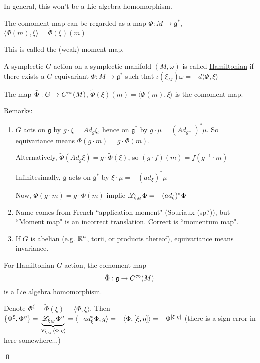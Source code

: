 \documentclass[x11names,reqno,14pt]{extarticle}
\newcommand{\mk}[1]{\mathfrak{#1}}
\newcommand{\g}{\mk{g}}
\newcommand{\pois}[2]{\{#1,#2\}}
\begin{document}
In general, this won't be a Lie algebra homomorphism. 

The comoment map can be regarded as a map $\Phi:M \to \g^*$, $\langle \Phi(m),\xi\rangle = \tilde{\Phi}(\xi)(m)$

This is called the (weak) moment map. 


A symplectic $G$-action on a symplectic manifold $(M,\omega)$ is called \underline{Hamiltonian} if there exists a $G$-equivariant $\Phi:M\to\g^*$ such that $\iota(\xi_M)\omega = -d\langle\Phi,\xi\rangle$

The map $\tilde{\Phi}:G\to C^\infty(M)$, $\tilde{\Phi}(\xi)(m) = \langle \Phi(m),\xi\rangle$ is the comoment map. 

\underline{Remarks:}
\begin{enumerate}
	\item $G$ acts on $\g$ by $g\cdot\xi = Ad_g\xi$, hence on $\g^*$ by $g\cdot\mu = (Ad_{g^{-1}})^*\mu$. So equivariance means $\Phi(g\cdot m) = g\cdot\Phi(m)$.

Alternatively, $\tilde{\Phi}(Ad_g\xi) = g\cdot\tilde{\Phi}(\xi)$, so $(g\cdot f)(m) = f(g^{-1}\cdot m)$

Infinitesimally, $\g$ acts on $\g^*$ by $\xi\cdot\mu = -(ad_\xi)^*\mu$

Now, $\Phi(g\cdot m) = g\cdot \Phi(m)$ implie $\mathscr{L}_{\zeta_M}\Phi = -(ad_\zeta)^*\Phi$

\item Name comes from French ``application moment" (Souriaux (sp?)), but ``Moment map" is an incorrect translation. Correct is ``momentum map". 

\item If $G$ is abelian (e.g. $\mathbb{R}^n$, torii, or products thereof), equivariance means invariance. 
\end{enumerate}

\prop

For Hamiltonian $G$-action, the comoment map 
\[
\tilde{\Phi}:\g\to C^\oo(M)
\]
is a Lie algebra homomorphism. 

\proof

Denote $\Phi^\xi = \tilde{\Phi}(\xi) = \langle \Phi, \xi\rangle$. Then $\pois{\Phi^\xi}{\Phi^\eta} = \underbrace{\ms{L}_{\xi_M}\Phi^\eta}_{\ms{L}_{\xi_M}\langle\Phi,\eta\rangle} = \langle -ad_\xi^*\Phi,g\rangle = -\langle\Phi,[\xi,\eta]\rangle = -\Phi^{[\xi,\eta]}$ (there is a sign error in here somewhere...)

\qed

\prop
\end{document}

